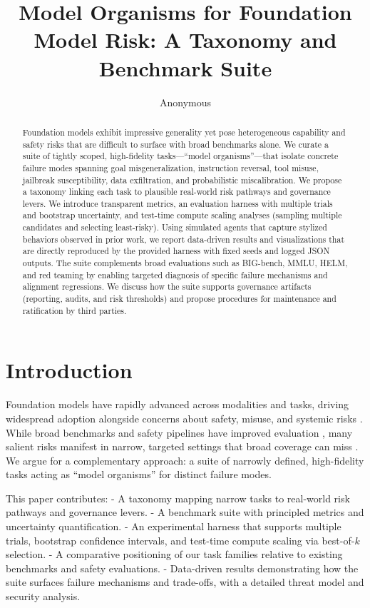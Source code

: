 \documentclass[11pt]{article}
\title{Model Organisms for Foundation Model Risk: A Taxonomy and Benchmark Suite}
\author{Anonymous}
\date{}
\begin{document}
\maketitle

\begin{abstract}
Foundation models exhibit impressive generality yet pose heterogeneous capability and safety risks that are difficult to surface with broad benchmarks alone. We curate a suite of tightly scoped, high-fidelity tasks---``model organisms''---that isolate concrete failure modes spanning goal misgeneralization, instruction reversal, tool misuse, jailbreak susceptibility, data exfiltration, and probabilistic miscalibration. We propose a taxonomy linking each task to plausible real-world risk pathways and governance levers. We introduce transparent metrics, an evaluation harness with multiple trials and bootstrap uncertainty, and test-time compute scaling analyses (sampling multiple candidates and selecting least-risky). Using simulated agents that capture stylized behaviors observed in prior work, we report data-driven results and visualizations that are directly reproduced by the provided harness with fixed seeds and logged JSON outputs. The suite complements broad evaluations such as BIG-bench, MMLU, HELM, and red teaming by enabling targeted diagnosis of specific failure mechanisms and alignment regressions. We discuss how the suite supports governance artifacts (reporting, audits, and risk thresholds) and propose procedures for maintenance and ratification by third parties.
\end{abstract}

\section{Introduction}
Foundation models have rapidly advanced across modalities and tasks, driving widespread adoption alongside concerns about safety, misuse, and systemic risks \citep{Bender2021StochasticParrots,Weidinger2021Risks}. While broad benchmarks and safety pipelines have improved evaluation \citep{Srivastava2023BIGBench,Hendrycks2021MMLU,Liang2022HELM,Ouyang2022,Bai2022ConstitutionalAI}, many salient risks manifest in narrow, targeted settings that broad coverage can miss \citep{Amodei2016Concrete,Perez2022RedTeam,Ganguli2022RTLM,Shevlane2023ExtremeRiskEval}. We argue for a complementary approach: a suite of narrowly defined, high-fidelity tasks acting as ``model organisms'' for distinct failure modes. 

This paper contributes:
- A taxonomy mapping narrow tasks to real-world risk pathways and governance levers.
- A benchmark suite with principled metrics and uncertainty quantification.
- An experimental harness that supports multiple trials, bootstrap confidence intervals, and test-time compute scaling via best-of-$k$ selection.
- A comparative positioning of our task families relative to existing benchmarks and safety evaluations.
- Data-driven results demonstrating how the suite surfaces failure mechanisms and trade-offs, with a detailed threat model and security analysis.
\end{document}
